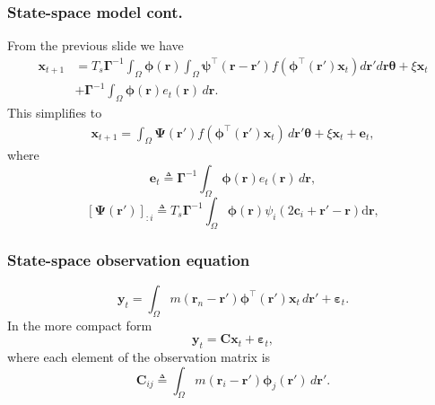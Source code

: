 \documentclass[compress]{beamer}
\begin{document}
\begin{frame}\frametitle{State-space model cont.}
From the previous slide we have
	\begin{align}
	    \label{eq:ReducedForm}
		 \mathbf{x}_{t+1} &= T_s\boldsymbol{\Gamma}^{-1}
		 \int_\Omega \boldsymbol{\phi}(\mathbf{r}) 
		 \int_\Omega \boldsymbol{\psi}^{\top} (\mathbf{r}-\mathbf{r}')f(\boldsymbol{\phi}^{\top}(\mathbf{r}')\mathbf{x}_t)d\mathbf{r}' d\mathbf{r} \boldsymbol{\theta} + \xi\mathbf{x}_t \nonumber \\ &+ \boldsymbol{\Gamma}^{-1} \int_\Omega{\boldsymbol{\phi}(\mathbf{r}) e_t(\mathbf{r}) \, d\mathbf{r}}. \nonumber
	\end{align}	
\pause
This simplifies to	
\begin{align}
	\mathbf{x}_{t+1} = \int_\Omega \boldsymbol{\Psi}(\mathbf{r}') f(\boldsymbol{\phi}^{\top}(\mathbf{r}')\mathbf{x}_t) \, d\mathbf{r}' \boldsymbol{\theta} + \xi\mathbf{x}_t 
+ \mathbf{e}_t,
\end{align}
\pause
where
\begin{equation}\label{eq:Wt} 
	\mathbf{e}_t \triangleq \boldsymbol{\Gamma}^{-1}\int_\Omega {\boldsymbol{\phi} ( \mathbf{r} )e_t( \mathbf{r} ) \, d\mathbf{r}},
\end{equation}
\begin{equation}\label{eq:DefPsi}
	\left[ \boldsymbol\Psi(\mathbf{r}')\right]_{:i}  \triangleq T_s\boldsymbol{\Gamma}^{-1}\int_\Omega {\boldsymbol{\phi}(\mathbf{r})\psi_i (2\mathbf{c}_i+\mathbf{r}'-\mathbf{r})\textrm{d}\mathbf{r}},
\end{equation}
\end{frame}

\begin{frame}\frametitle{State-space observation equation}
	\begin{equation}\label{eq:ReducedObservationEquation}
		\mathbf{y}_t = \int_{\Omega}{m\left(\mathbf{r}_n-\mathbf{r}'\right)\boldsymbol{\phi}^{\top}\left(\mathbf{r'}\right) \mathbf{x}_t\, d\mathbf{r}'} + \boldsymbol{\varepsilon}_t. 
	\end{equation}
	\pause
	In the more compact form
	\begin{equation}\label{ObservationEquation} 
		\mathbf{y}_t = \mathbf{C}\mathbf{x}_t + \boldsymbol{\varepsilon}_t,
	\end{equation}
	where each element of the observation matrix is 
	\begin{equation}
		\mathbf{C}_{ij} \triangleq \int_{\Omega}m(\mathbf{r}_i - \mathbf{r}')\boldsymbol{\phi}_j(\mathbf{r}') \, d\mathbf{r}'.
	\end{equation}
\end{frame}
\end{document}
